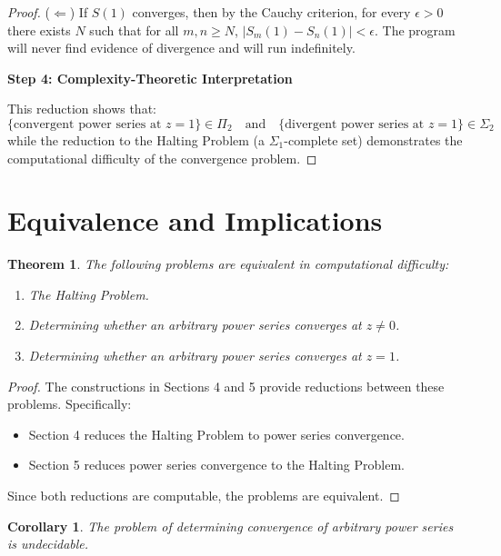 \documentclass[12pt, a4paper]{article}
\newtheorem{theorem}{Theorem}
\newtheorem{corollary}{Corollary}
\begin{document}
\begin{proof}
($\Leftarrow$) If $S(1)$ converges, then by the Cauchy criterion, for every $\epsilon > 0$ there exists $N$ such that for all $m,n \geq N$, $|S_m(1) - S_n(1)| < \epsilon$. The program will never find evidence of divergence and will run indefinitely.

\vspace{0.5em}
\noindent\textbf{Step 4: Complexity-Theoretic Interpretation}

This reduction shows that:
\[
\{\text{convergent power series at } z=1\} \in \Pi_2 \quad \text{and} \quad \{\text{divergent power series at } z=1\} \in \Sigma_2
\]
while the reduction to the Halting Problem (a $\Sigma_1$-complete set) demonstrates the computational difficulty of the convergence problem.

\end{proof}

\section{Equivalence and Implications}

\begin{theorem}
The following problems are equivalent in computational difficulty:
\begin{enumerate}
\item The Halting Problem.
\item Determining whether an arbitrary power series converges at $z \neq 0$.
\item Determining whether an arbitrary power series converges at $z = 1$.
\end{enumerate}
\end{theorem}

\begin{proof}
The constructions in Sections 4 and 5 provide reductions between these problems. Specifically:
\begin{itemize}
\item Section 4 reduces the Halting Problem to power series convergence.
\item Section 5 reduces power series convergence to the Halting Problem.
\end{itemize}
Since both reductions are computable, the problems are equivalent.
\end{proof}

\begin{corollary}
The problem of determining convergence of arbitrary power series is undecidable.
\end{corollary}
\end{document}
